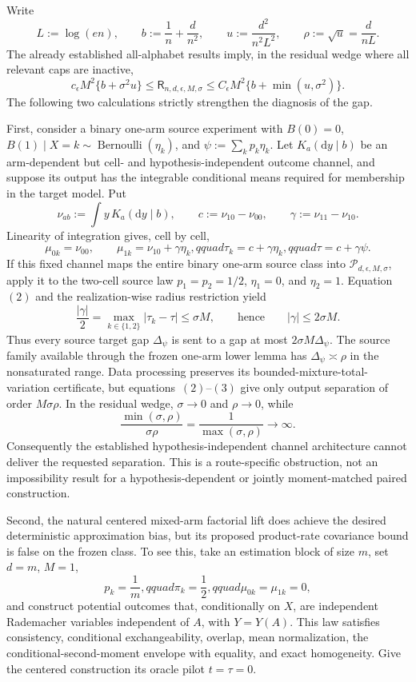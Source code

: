 Write
\[
 L:=\log(en),\qquad b:=\frac1n+\frac d{n^2},\qquad
 u:=\frac{d^2}{n^2L^2},\qquad \rho:=\sqrt u=\frac d{nL}.
\]
The already established all-alphabet results imply, in the residual wedge where all relevant caps are inactive,
\[
 c_{\epsilon}M^2\{b+\sigma^2u\}
 \le \mathsf R_{n,d,\epsilon,M,\sigma}
 \le C_{\epsilon}M^2\{b+\min(u,\sigma^2)\}.
\tag{1}
\]
The following two calculations strictly strengthen the diagnosis of the gap.

First, consider a binary one-arm source experiment with \(B(0)=0\),
\(B(1)\mid X=k\sim\operatorname{Bernoulli}(\eta_k)\), and
\(\psi:=\sum_kp_k\eta_k\).  Let \(K_a(\mathrm dy\mid b)\) be an arm-dependent but cell- and hypothesis-independent outcome channel, and suppose its output has the integrable conditional means required for membership in the target model.  Put
\[
 \nu_{ab}:=\int y\,K_a(\mathrm dy\mid b),\qquad
 c:=\nu_{10}-\nu_{00},\qquad \gamma:=\nu_{11}-\nu_{10}.
\]
Linearity of integration gives, cell by cell,
\[
 \mu_{0k}=\nu_{00},\qquad
 \mu_{1k}=\nu_{10}+\gamma\eta_k,qquad
 \tau_k=c+\gamma\eta_k,qquad
 \tau=c+\gamma\psi.
\tag{2}
\]
If this fixed channel maps the entire binary one-arm source class into
\(\mathcal P_{d,\epsilon,M,\sigma}\), apply it to the two-cell source law
\(p_1=p_2=1/2\), \(\eta_1=0\), and \(\eta_2=1\).  Equation~\((2)\) and the realization-wise radius restriction yield
\[
 \frac{|\gamma|}{2}
 =\max_{k\in\{1,2\}}|\tau_k-\tau|
 \le \sigma M,
 \qquad\text{hence}\qquad |\gamma|\le2\sigma M.
\tag{3}
\]
Thus every source target gap \(\Delta_{\psi}\) is sent to a gap at most
\(2\sigma M\Delta_{\psi}\).  The source family available through the frozen one-arm lower lemma has
\(\Delta_{\psi}\asymp\rho\) in the nonsaturated range.  Data processing preserves its bounded-mixture-total-variation certificate, but equations~\((2)\)--\((3)\) give only output separation of order \(M\sigma\rho\).  In the residual wedge, \(\sigma\to0\) and \(\rho\to0\), while
\[
 \frac{\min(\sigma,\rho)}{\sigma\rho}
 =\frac1{\max(\sigma,\rho)}\longrightarrow\infty.
\tag{4}
\]
Consequently the established hypothesis-independent channel architecture cannot deliver the requested separation.  This is a route-specific obstruction, not an impossibility result for a hypothesis-dependent or jointly moment-matched paired construction.

Second, the natural centered mixed-arm factorial lift does achieve the desired deterministic approximation bias, but its proposed product-rate covariance bound is false on the frozen class.  To see this, take an estimation block of size \(m\), set \(d=m\), \(M=1\),
\[
 p_k=\frac1m,qquad \pi_k=\frac12,qquad \mu_{0k}=\mu_{1k}=0,
\]
and construct potential outcomes that, conditionally on \(X\), are independent Rademacher variables independent of \(A\), with \(Y=Y(A)\).  This law satisfies consistency, conditional exchangeability, overlap, mean normalization, the conditional-second-moment envelope with equality, and exact homogeneity.  Give the centered construction its oracle pilot \(t=\tau=0\).

